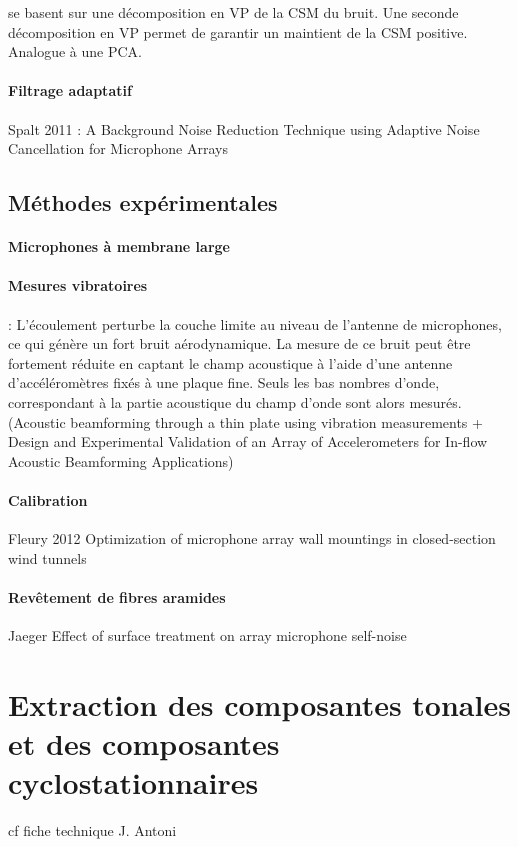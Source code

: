 \cite{Bahr2015} se basent sur une décomposition en VP de la CSM du bruit. Une seconde décomposition en VP permet de garantir un maintient de la CSM positive. Analogue à une PCA.

\paragraph{\tbullet Filtrage adaptatif}
Spalt 2011 : A Background Noise Reduction Technique using Adaptive Noise Cancellation for Microphone Arrays\\










\subsection{Méthodes expérimentales}

\paragraph{\tbullet Microphones à membrane large}

\paragraph{\tbullet Mesures vibratoires} \cite{Lecoq2013} : L'écoulement perturbe la couche limite au niveau de l'antenne de microphones, ce qui génère un fort bruit aérodynamique. La mesure de ce bruit peut être fortement réduite en captant le champ acoustique à l'aide d'une antenne d'accéléromètres fixés à une plaque fine. Seuls les bas nombres d'onde, correspondant à la partie acoustique du champ d'onde sont alors mesurés. (Acoustic beamforming through a thin plate using vibration measurements  +   Design and Experimental Validation of an Array of Accelerometers for In-flow Acoustic Beamforming Applications) \\

\paragraph{\tbullet Calibration} Fleury 2012 Optimization of microphone array wall mountings in closed-section wind tunnels

\paragraph{\tbullet Revêtement de fibres aramides} Jaeger Effect of surface treatment on array microphone self-noise


\section{Extraction des composantes tonales et des composantes cyclostationnaires}
cf fiche technique J. Antoni

